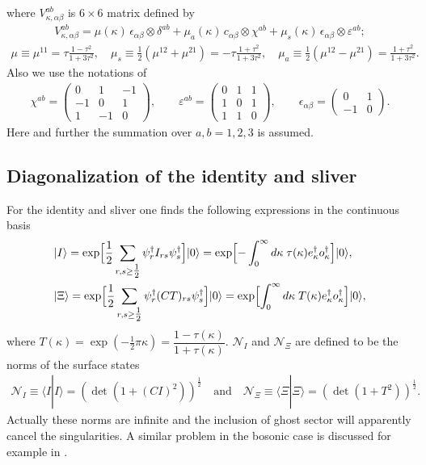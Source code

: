\documentclass[a4paper,12pt]{article}
\newcommand{\Nc}{\mathcal{N}}
\begin{document}
where $V^{ab}_{\kappa,\alpha\beta}$ is $6\times 6$
matrix defined by
\begin{gather}
V^{ab}_{\kappa,\alpha\beta}=
\mu(\kappa)\,\epsilon_{\alpha\beta}\otimes\delta^{ab}
+\mu_a(\kappa)\,c_{\alpha\beta}\otimes\chi^{ab}
+\mu_s(\kappa)\,\epsilon_{\alpha\beta}\otimes\varepsilon^{ab};
\end{gather}
\begin{gather}
\mu\equiv\mu^{11}=\tau\frac{1-\tau^2}{1+3\tau^2},\quad
\mu_{s}\equiv\frac12(\mu^{12}+\mu^{21})=
-\tau\frac{1+\tau^2}{1+3\tau^2},\quad
\mu_a\equiv\frac12(\mu^{12}-\mu^{21})
=\frac{1+\tau^2}{1+3\tau^2}.
\label{mu-tau}
\end{gather}
Also we use the notations of \cite{0207174}
\begin{gather}
\chi^{ab}=\begin{pmatrix}
  0 & 1 & -1 \\
  -1 & 0 & 1 \\
  1 & -1 & 0
\end{pmatrix},\qquad
\varepsilon^{ab}=\begin{pmatrix}
  0 & 1 & 1 \\
  1 & 0 & 1 \\
  1 & 1 & 0
\end{pmatrix},\qquad
\epsilon_{\alpha\beta}=\begin{pmatrix}
  0 & 1 \\
  -1 & 0
\end{pmatrix}.
\label{matrices-e}
\end{gather}
Here and further the summation over $a,b=1,2,3$ is assumed.

\subsection{Diagonalization of the identity and sliver}

For the identity and sliver one finds the following expressions
in the continuous basis
\begin{align}
&|I\rangle
=\exp\Bigl[\frac12\sum_{r,s\geq\tfrac12}\psi_{r}^{\dagger}
I_{rs}\psi_{s}^{\dagger}\Bigr]|0\rangle
=\exp\Bigl[-\int_{0}^{\infty}d\kappa\;
\tau(\kappa) e_{\kappa}^{\dag}o_{\kappa}^{\dag}\Bigr]|0\rangle,
\label{diag-iden}
\\
&|\Xi\rangle
=\exp\Bigl[\frac12\sum_{r,s\geq\tfrac12}
\psi_{r}^{\dagger}
(CT)_{rs}
\psi_{s}^{\dagger}\Bigr]|0\rangle
=\exp\Bigl[\int_{0}^{\infty}d\kappa\;
T(\kappa) e_{\kappa}^{\dag}o_{\kappa}^{\dag}\Bigr]
|0\rangle,
\label{diag-sliv}
\end{align}
where $T(\kappa)=\exp(-\tfrac12 \pi\kappa)
=\dfrac{1-\tau(\kappa)}{1+\tau(\kappa)}$.
$\Nc_{I}$ and $\Nc_{\Xi}$ are defined to be the norms
of the surface states
\begin{gather}
\Nc_{I}\equiv\langle I|I\rangle=(\det(1+(CI)^2))^{\tfrac12}\quad
\text{and}\quad
\Nc_{\Xi}\equiv\langle \Xi|\Xi\rangle=(\det(1+T^2))^{\tfrac12}.
\end{gather}
Actually these norms are infinite
and the inclusion of ghost sector
will apparently cancel the singularities.
A similar problem in the bosonic case is discussed
for example in \cite{0207174}.
\end{document}
